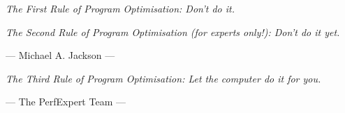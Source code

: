 \documentclass[11pt,a4paper,oneside]{book}
\begin{document}
\pagestyle{empty}



\glsaddall
\glstoctrue
\printglossaries

\cleardoublepage
\printindex

\tableofcontents



\emph{The First Rule of Program Optimisation: Don't do it.}

\emph{The Second Rule of Program Optimisation (for experts only!): Don't do it yet.}

  ---  Michael A. Jackson ---

\emph{The Third Rule of Program Optimisation: Let the computer do it for you.}

--- The PerfExpert Team ---






\appendix


\end{document}
